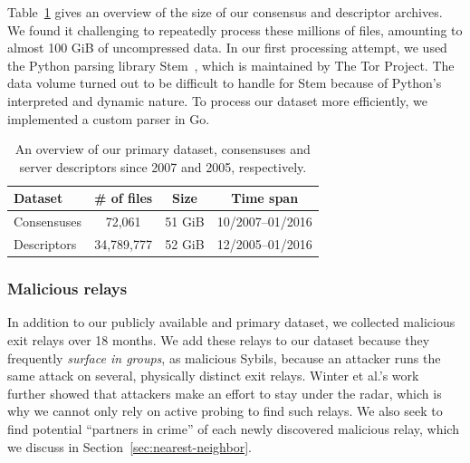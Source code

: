 Table~\ref{tab:collector-dataset} gives an overview of the size of our consensus
and descriptor archives.  We found it challenging to repeatedly process these
millions of files, amounting to almost 100 GiB of uncompressed data.  In our
first processing attempt, we used the Python parsing library Stem~\cite{stem},
which is maintained by The Tor Project.  The data volume turned out to be
difficult to handle for Stem because of Python's interpreted and dynamic nature.
To process our dataset more efficiently, we implemented a custom parser in Go.

\begin{table}[t]
\small
\centering
\begin{tabular}{l c c c}
\hline
\textbf{Dataset} & \textbf{\# of files} & \textbf{Size} & \textbf{Time span} \\
\hline
Consensuses & 72,061 & 51 GiB & 10/2007--01/2016 \\
Descriptors & 34,789,777 & 52 GiB & 12/2005--01/2016 \\
\hline
\end{tabular}
\caption{An overview of our primary dataset, consensuses and server descriptors
since 2007 and 2005, respectively.}
\label{tab:collector-dataset}
\end{table}

\subsubsection{Malicious relays}
In addition to our publicly available and primary dataset, we collected
malicious exit relays over 18 months.  We add these relays to our dataset
because they frequently \emph{surface in groups}, as malicious Sybils, because
an attacker runs the same attack on several, physically distinct exit
relays.  Winter et al.'s work~\cite[\S 5.2]{Winter2014a} further showed that
attackers make an effort to stay under the radar, which is why we cannot only
rely on active probing to find such relays.  We also seek to find potential
``partners in crime'' of each newly discovered malicious relay, which we discuss
in Section~\ref{sec:nearest-neighbor}.

